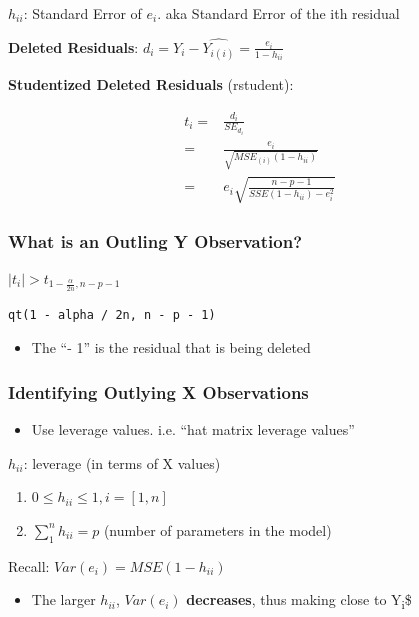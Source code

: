 \documentclass[11pt]{article}
\begin{document}
\(h_{ii}\): Standard Error of \(e_i\). aka Standard Error of the ith residual

\textbf{Deleted Residuals}: \(d_i = Y_i - \hat{Y_{i(i)}} = \frac{e_i}{1 - h_{ii}}\)

\textbf{Studentized Deleted Residuals} (rstudent):

\begin{equation}
\begin{split}
t_i = & \frac{d_i}{SE_{d_i}}\\
= & \frac{e_i}{\sqrt{MSE_{(i)}(1 - h_{ii})}}\\
= & e_i \sqrt{\frac{n - p - 1}{SSE(1 - h_{ii}) - e_i^2} }
\end{split}
\end{equation}

\subsubsection{What is an Outling Y Observation?}
\label{sec:org5c18d25}
\(|t_i| > t_{1 - \frac{\alpha}{2n}, n - p - 1}\)
\begin{verbatim}
qt(1 - alpha / 2n, n - p - 1)
\end{verbatim}
\begin{itemize}
\item The ``- 1'' is the residual that is being deleted
\end{itemize}
\subsubsection{Identifying Outlying X Observations}
\label{sec:org826e464}
\begin{itemize}
\item Use leverage values. i.e. ``hat matrix leverage values''
\end{itemize}
\(h_{ii}\): leverage (in terms of X values)
\begin{enumerate}
\item \(0 \leq h_{ii} \leq 1, i = [1,n]\)
\item \(\sum_{1}^{n} h_{ii} = p\) (number of parameters in the model)
\end{enumerate}

Recall: \(Var(e_i) = MSE(1 - h_{ii})\)
\begin{itemize}
\item The larger \(h_{ii}\), \(Var(e_i)\) \textbf{decreases}, thus making  close to
Y\textsubscript{i}\$
\end{itemize}
\end{document}
